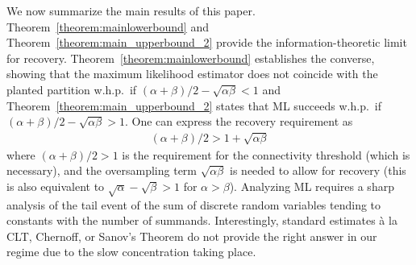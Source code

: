 \documentclass[english]{article}
\newcommand{\1}{\textbf{1}}
\begin{document}









We now summarize the main results of this paper. Theorem~\ref{theorem:mainlowerbound} and Theorem~\ref{theorem:main_upperbound_2} provide the information-theoretic limit for recovery. 
Theorem~\ref{theorem:mainlowerbound} establishes the converse, showing that the maximum likelihood estimator does not coincide with the planted partition w.h.p.\  if $(\alpha + \beta)/2 - \sqrt{\alpha \beta} < 1$ and Theorem~\ref{theorem:main_upperbound_2} states that ML succeeds w.h.p.\  if $(\alpha + \beta)/2 - \sqrt{\alpha \beta} > 1$. 
One can express the recovery requirement as 
\begin{align}
(\alpha + \beta)/2  > 1 + \sqrt{\alpha \beta}
\end{align}
where $(\alpha + \beta)/2  > 1$ is the requirement for the connectivity threshold (which is necessary), and the oversampling term $\sqrt{\alpha \beta}$ is needed to allow for recovery (this is also equivalent to $\sqrt{\alpha}- \sqrt{\beta} >1$ for $\alpha >\beta$). Analyzing ML requires a sharp analysis of the tail event of the sum of discrete random variables tending to constants with the number of summands. Interestingly, standard estimates \`a la CLT, Chernoff, or Sanov's Theorem do not provide the right answer in our regime due to the slow concentration taking place.  
\end{document}
